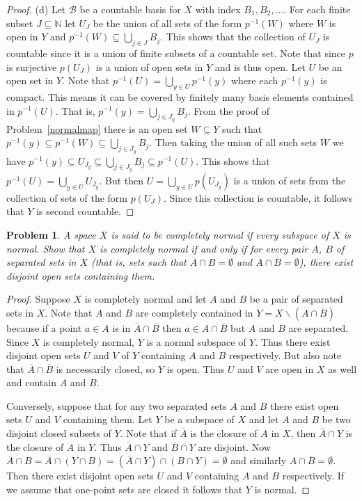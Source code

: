 \documentclass{article}
\newtheorem{problem}{Problem}
\begin{document}
\begin{proof}
(d) Let $\mathcal{B}$ be a countable basis for $X$ with index $B_1, B_2, \dots$. For each finite subset $J \subseteq \mathbb{N}$ let $U_J$ be the union of all sets of the form $p^{-1}(W)$ where $W$ is open in $Y$ and $p^{-1}(W) \subseteq \bigcup_{j \in J} B_j$. This shows that the collection of $U_J$ is countable since it is a union of finite subsets of a countable set. Note that since $p$ is surjective $p(U_J)$ is a union of open sets in $Y$ and is thus open. Let $U$ be an open set in $Y$. Note that $p^{-1}(U) = \bigcup_{y \in U} p^{-1}(y)$ where each $p^{-1}(y)$ is compact. This means it can be covered by finitely many basis elements contained in $p^{-1}(U)$. That is, $p^{-1}(y) = \bigcup_{j \in J_y} B_j$. From the proof of Problem~\ref{normalmap} there is an open set $W \subseteq Y$ such that $p^{-1}(y) \subseteq p^{-1}(W) \subseteq \bigcup_{j \in J_y} B_j$. Then taking the union of all such sets $W$ we have $p^{-1}(y) \subseteq U_{J_y} \subseteq \bigcup_{j \in J_y} B_j \subseteq p^{-1}(U)$. This shows that $p^{-1}(U) = \bigcup_{y \in U} U_{J_y}$. But then $U = \bigcup_{y \in U} p(U_{J_y})$ is a union of sets from the collection of sets of the form $p(U_J)$. Since this collection is countable, it follows that $Y$ is second countable.
\end{proof}

\begin{problem}
\label{completelynormal}
A space $X$ is said to be \emph{completely normal} if every subspace of $X$ is normal. Show that $X$ is completely normal if and only if for every pair $A$, $B$ of separated sets in $X$ (that is, sets such that $\overline{A} \cap B = \emptyset$ and $A \cap \overline{B} = \emptyset$), there exist disjoint open sets containing them.
\end{problem}
\begin{proof}
Suppose $X$ is completely normal and let $A$ and $B$ be a pair of separated sets in $X$. Note that $A$ and $B$ are completely contained in $Y = X \backslash (\overline{A} \cap \overline{B})$ because if a point $a \in A$ is in $\overline{A} \cap \overline{B}$ then $a \in A \cap \overline{B}$ but $A$ and $B$ are separated. Since $X$ is completely normal, $Y$ is a normal subspace of $Y$. Thus there exist disjoint open sets $U$ and $V$ of $Y$ containing $A$ and $B$ respectively. But also note that $\overline{A} \cap \overline{B}$ is necessarily closed, so $Y$ is open. Thus $U$ and $V$ are open in $X$ as well and contain $A$ and $B$.

Conversely, suppose that for any two separated sets $A$ and $B$ there exist open sets $U$ and $V$ containing them. Let $Y$ be a subspace of $X$ and let $A$ and $B$ be two disjoint closed subsets of $Y$. Note that if $\overline{A}$ is the closure of $A$ in $X$, then $\overline{A} \cap Y$ is the closure of $A$ in $Y$. Thus $\overline{A} \cap Y$ and $\overline{B} \cap Y$ are disjoint. Now $\overline{A} \cap B = \overline{A} \cap (Y \cap B) = (\overline{A} \cap Y) \cap (B \cap Y) = \emptyset$ and similarly $A \cap \overline{B} = \emptyset$. Then there exist disjoint open sets $U$ and $V$ containing $A$ and $B$ respectively. If we assume that one-point sets are closed it follows that $Y$ is normal.
\end{proof}
\end{document}
